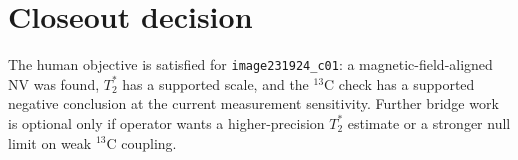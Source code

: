 \documentclass[11pt]{article}
\begin{document}
\section*{Closeout decision}
The human objective is satisfied for \texttt{image231924\_c01}: a magnetic-field-aligned
NV was found, $T_2^*$ has a supported scale, and the $^{13}$C check has a supported
negative conclusion at the current measurement sensitivity. Further bridge work is
optional only if operator wants a higher-precision $T_2^*$ estimate or a stronger
null limit on weak $^{13}$C coupling.
\end{document}
